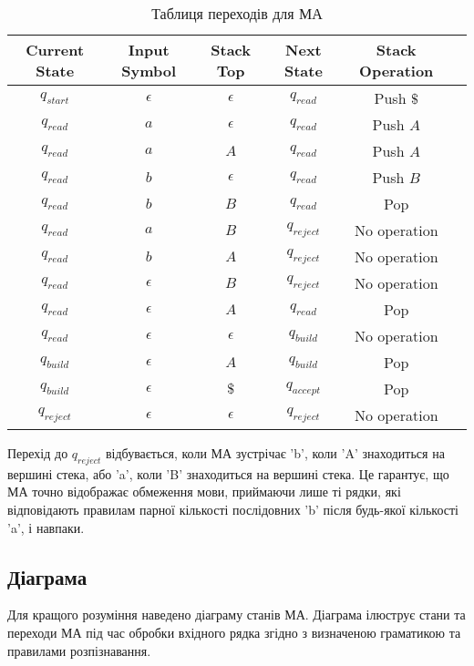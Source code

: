 \documentclass[12pt,a4paper]{article}
\begin{document}
\begin{table}[h]
\centering
\begin{tabular}{c c c c c c}
\hline
Current State & Input Symbol & Stack Top & Next State & Stack Operation \\
\hline
\( q_{start} \) & \( \epsilon \) & \( \epsilon \) & \( q_{read} \) & Push \( \$ \) \\
\( q_{read} \) & \( a \) & \( \epsilon \) & \( q_{read} \) & Push \( A \) \\
\( q_{read} \) & \( a \) & \( A \) & \( q_{read} \) & Push \( A \) \\
\( q_{read} \) & \( b \) & \( \epsilon \) & \( q_{read} \) & Push \( B \) \\
\( q_{read} \) & \( b \) & \( B \) & \( q_{read} \) & Pop \\
\( q_{read} \) & \( a \) & \( B \) & \( q_{reject} \) & No operation \\
\( q_{read} \) & \( b \) & \( A \) & \( q_{reject} \) & No operation \\
\( q_{read} \) & \( \epsilon \) & \( B \) & \( q_{reject} \) & No operation \\
\( q_{read} \) & \( \epsilon \) & \( A \) & \( q_{read} \) & Pop \\
\( q_{read} \) & \( \epsilon \) & \( \epsilon \) & \( q_{build} \) & No operation \\
\( q_{build} \) & \( \epsilon \) & \( A \) & \( q_{build} \) & Pop \\
\( q_{build} \) & \( \epsilon \) & \( \$ \) & \( q_{accept} \) & Pop \\
\( q_{reject} \) & \( \epsilon \) & \( \epsilon \) & \( q_{reject} \) & No operation \\
\hline
\end{tabular}
\caption{Таблиця переходів для МА}
\label{tab:transition_table}
\end{table}

Перехід до \( q_{reject} \) відбувається, коли МА зустрічає 'b', коли 'A' знаходиться на вершині стека, або 'a', коли 'B' знаходиться на вершині стека. Це гарантує, що МА точно відображає обмеження мови, приймаючи лише ті рядки, які відповідають правилам парної кількості послідовних 'b' після будь-якої кількості 'a', і навпаки.

\subsection*{Діаграма}
Для кращого розуміння наведено діаграму станів МА. Діаграма ілюструє стани та переходи МА під час обробки вхідного рядка згідно з визначеною граматикою та правилами розпізнавання.
\end{document}
